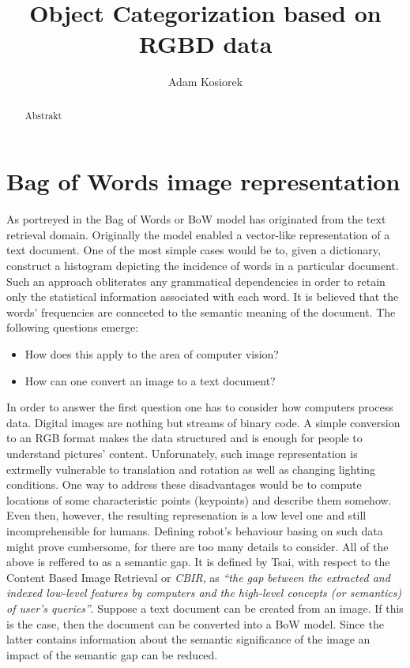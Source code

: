 \documentclass[a4paper,12pt]{article}
\title{Object Categorization based on RGBD data}
\author{Adam Kosiorek}
\begin{document}
\maketitle

\begin{abstract}

Abstrakt

\end{abstract}

%

\section{Bag of Words image representation}

  As portreyed in \cite{tsai2012bag} the Bag of Words or BoW model has originated from the text retrieval domain. Originally the model enabled a vector-like representation of a text document. One of the most simple cases would be to, given a dictionary, construct a histogram depicting the incidence of words in a particular document. Such an approach obliterates any grammatical dependencies in order to retain only the statistical information associated with each word. It is believed that the words' frequencies are connceted to the semantic meaning of the document. The following questions emerge: 
  
  \begin{itemize}
    \item How does this apply to the area of computer vision?
    \item How can one convert an image to a text document? 
  \end{itemize}
  
  In order to answer the first question one has to consider how computers process data. Digital images are nothing but streams of binary code. A simple conversion to an RGB format makes the data structured and is enough for people to understand pictures' content. Unforunately, such image representation is extrmelly vulnerable to translation and rotation as well as changing lighting conditions. One way to address these disadvantages would be to compute locations of some characteristic points (keypoints) and describe them somehow. Even then, however, the resulting represenation is a low level one and still incomprehensible for humans. Defining robot's behaviour basing on such data might prove cumbersome, for there are too many details to consider. All of the above is reffered to as a semantic gap. It is defined by Tsai, with respect to the Content Based Image Retrieval or \textit{CBIR}, as \emph{``the gap between the extracted and indexed low-level features by computers and the high-level concepts (or semantics) of user’s queries''}. Suppose a text document can be created from an image. If this is the case, then the document can be converted into a BoW model. Since the latter contains information about the semantic significance of the image an impact of the semantic gap can be reduced.
  
\end{document}
